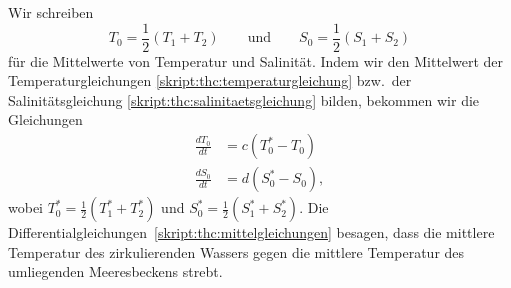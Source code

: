 Wir schreiben
\[
T_0
=
\frac12(T_1+T_2)
\qquad\text{und}\qquad
S_0
=
\frac12(S_1+S_2)
\]
für die Mittelwerte von Temperatur und Salinität.
Indem wir den Mittelwert der Temperaturgleichungen
\eqref{skript:thc:temperaturgleichung}
bzw.~der Salinitätsgleichung \eqref{skript:thc:salinitaetsgleichung} bilden,
bekommen wir die Gleichungen
\begin{equation}
\begin{aligned}
\frac{dT_0}{dt}
&=
c(T_0^*-T_0)
\\
\frac{dS_0}{dt}
&=
d(S_0^*-S_0),
\end{aligned}
\label{skript:thc:mittelgleichung}
\end{equation}
wobei $T_0^* = \frac12(T_1^*+T_2^*)$ und $S_0^* = \frac12(S_1^*+S_2^*)$.
Die Differentialgleichungen~\ref{skript:thc:mittelgleichungen} 
besagen, dass die mittlere Temperatur des zirkulierenden Wassers
gegen die mittlere Temperatur des umliegenden Meeresbeckens strebt.

